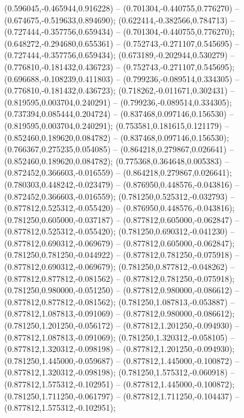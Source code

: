  (0.596045,-0.465944,0.916228) -- (0.701304,-0.440755,0.776270) -- (0.674675,-0.519633,0.894690);
 (0.622414,-0.382566,0.784713) -- (0.727444,-0.357756,0.659434) -- (0.701304,-0.440755,0.776270);
 (0.648272,-0.294680,0.655361) -- (0.752743,-0.271107,0.545695) -- (0.727444,-0.357756,0.659434);
 (0.673189,-0.202944,0.530279) -- (0.776810,-0.181432,0.436723) -- (0.752743,-0.271107,0.545695);
 (0.696688,-0.108239,0.411803) -- (0.799236,-0.089514,0.334305) -- (0.776810,-0.181432,0.436723);
 (0.718262,-0.011671,0.302431) -- (0.819595,0.003704,0.240291) -- (0.799236,-0.089514,0.334305);
 (0.737394,0.085444,0.204724) -- (0.837468,0.097146,0.156530) -- (0.819595,0.003704,0.240291);
 (0.753581,0.181615,0.121179) -- (0.852460,0.189620,0.084782) -- (0.837468,0.097146,0.156530);
 (0.766367,0.275235,0.054085) -- (0.864218,0.279867,0.026641) -- (0.852460,0.189620,0.084782);
 (0.775368,0.364648,0.005383) -- (0.872452,0.366603,-0.016559) -- (0.864218,0.279867,0.026641);
 (0.780303,0.448242,-0.023479) -- (0.876950,0.448576,-0.043816) -- (0.872452,0.366603,-0.016559);
 (0.781250,0.525312,-0.032793) -- (0.877812,0.525312,-0.055420) -- (0.876950,0.448576,-0.043816);
 (0.781250,0.605000,-0.037187) -- (0.877812,0.605000,-0.062847) -- (0.877812,0.525312,-0.055420);
 (0.781250,0.690312,-0.041230) -- (0.877812,0.690312,-0.069679) -- (0.877812,0.605000,-0.062847);
 (0.781250,0.781250,-0.044922) -- (0.877812,0.781250,-0.075918) -- (0.877812,0.690312,-0.069679);
 (0.781250,0.877812,-0.048262) -- (0.877812,0.877812,-0.081562) -- (0.877812,0.781250,-0.075918);
 (0.781250,0.980000,-0.051250) -- (0.877812,0.980000,-0.086612) -- (0.877812,0.877812,-0.081562);
 (0.781250,1.087813,-0.053887) -- (0.877812,1.087813,-0.091069) -- (0.877812,0.980000,-0.086612);
 (0.781250,1.201250,-0.056172) -- (0.877812,1.201250,-0.094930) -- (0.877812,1.087813,-0.091069);
 (0.781250,1.320312,-0.058105) -- (0.877812,1.320312,-0.098198) -- (0.877812,1.201250,-0.094930);
 (0.781250,1.445000,-0.059687) -- (0.877812,1.445000,-0.100872) -- (0.877812,1.320312,-0.098198);
 (0.781250,1.575312,-0.060918) -- (0.877812,1.575312,-0.102951) -- (0.877812,1.445000,-0.100872);
 (0.781250,1.711250,-0.061797) -- (0.877812,1.711250,-0.104437) -- (0.877812,1.575312,-0.102951);
